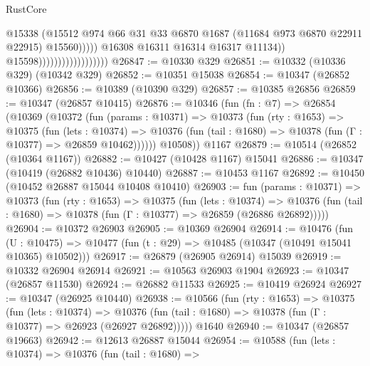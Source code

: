 \begin{lexlean}{RustCore}
\begin{coremodule}
                                                    @15338
                                                    (@15512
                                                      @974
                                                      @66
                                                      @31
                                                      @33
                                                      @6870
                                                      @1687
                                                      (@11684 @973 @6870 @22911 @22915)
                                                      @15560)))))
                                            @16308
                                            @16311
                                            @16314
                                            @16317
                                            @11134))
                                        @15598))))))))))))))))))
@26847 := @10330 @329
@26851 := @10332 (@10336 @329) (@10342 @329)
@26852 := @10351 @15038
@26854 := @10347 (@26852 @10366)
@26856 := @10389 (@10390 @329)
@26857 := @10385 @26856
@26859 := @10347 (@26857 @10415)
@26876 := @10346
    (fun (fn : @7) =>
    @26854
      (@10369
        (@10372
          (fun (params : @10371) =>
          @10373
            (fun (rty : @1653) =>
            @10375
              (fun (lets : @10374) =>
              @10376 (fun (tail : @1680) => @10378 (fun (Γ : @10377) => @26859 @10462))))))
        @10508))
    @1167
@26879 := @10514 (@26852 (@10364 @1167))
@26882 := @10427 (@10428 @1167) @15041
@26886 := @10347 (@10419 (@26882 @10436) @10440)
@26887 := @10453 @1167
@26892 := @10450 (@10452 @26887 @15044 @10408 @10410)
@26903 := fun (params : @10371) =>
  @10373
    (fun (rty : @1653) =>
    @10375
      (fun (lets : @10374) =>
      @10376 (fun (tail : @1680) => @10378 (fun (Γ : @10377) => @26859 (@26886 @26892)))))
@26904 := @10372 @26903
@26905 := @10369 @26904
@26914 := @10476
    (fun (U : @10475) => @10477 (fun (t : @29) => @10485 (@10347 (@10491 @15041 @10365) @10502)))
@26917 := @26879 (@26905 @26914) @15039
@26919 := @10332 @26904 @26914
@26921 := @10563 @26903 @1904
@26923 := @10347 (@26857 @11530)
@26924 := @26882 @11533
@26925 := @10419 @26924
@26927 := @10347 (@26925 @10440)
@26938 := @10566
    (fun (rty : @1653) =>
    @10375
      (fun (lets : @10374) =>
      @10376 (fun (tail : @1680) => @10378 (fun (Γ : @10377) => @26923 (@26927 @26892)))))
    @1640
@26940 := @10347 (@26857 @19663)
@26942 := @12613 @26887 @15044
@26954 := @10588
    (fun (lets : @10374) =>
    @10376
      (fun (tail : @1680) =>

\end{coremodule}
\end{lexlean}
